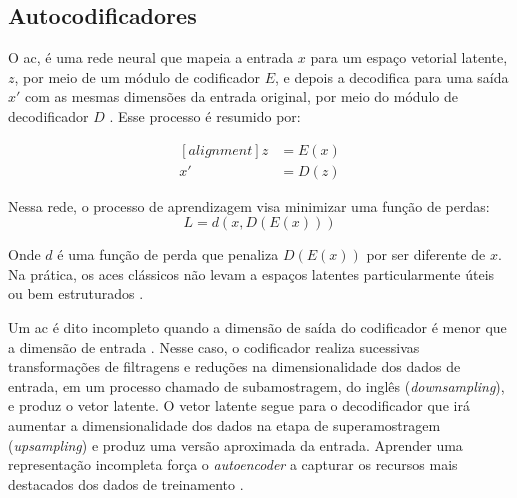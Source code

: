 
\subsection{Autocodificadores}


O \gls{ac}, é uma rede neural que mapeia a entrada $x$ para um espaço vetorial latente, $z$, por meio de um módulo de codificador $E$, e depois a decodifica para uma saída $x'$ com as mesmas dimensões da entrada original, por meio do módulo de decodificador $D$ \cite{FrancoisDeepLearning}. Esse processo é resumido por: 

\begin{equation}
\begin{aligned}[alignment]
z &= E(x)\\ 
x' &= D(z)	
\end{aligned}
\end{equation}

Nessa rede, o processo de aprendizagem visa minimizar uma função de perdas:
\begin{equation}
L = d(x,D(E(x)))
\end{equation}

Onde $d$ é uma função de perda que penaliza $D(E(x))$  por ser diferente de $x$. Na prática, os \acrshort{ac}es clássicos não levam a espaços latentes particularmente úteis ou bem estruturados \cite{FrancoisDeepLearning}. 



Um \acrshort{ac} é dito incompleto quando a dimensão de saída do codificador é menor que a dimensão de entrada \cite{Goodfellow2016}. Nesse caso, o codificador realiza sucessivas transformações de filtragens e reduções na dimensionalidade dos dados de entrada, em um processo chamado de subamostragem, do inglês (\textit{downsampling}), e produz o vetor latente. O vetor latente segue para o decodificador que irá aumentar a dimensionalidade dos dados na etapa de superamostragem (\textit{upsampling}) e produz uma versão aproximada da entrada. Aprender uma representação incompleta força o \textit{autoencoder}  a capturar os recursos mais destacados dos dados de treinamento \cite{Goodfellow2016}. 


